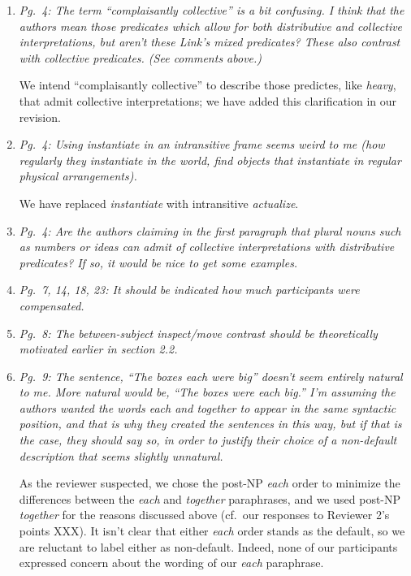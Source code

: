 \documentclass[12pt]{article}
\begin{document}
\begin{enumerate}
\item \emph{Pg.~4: The term ``complaisantly collective'' is a bit confusing. I think that the authors mean those predicates which allow for both distributive and collective interpretations, but aren't these Link's mixed predicates? These also contrast with collective predicates. (See comments above.)}

We intend ``complaisantly collective'' to describe those predictes, like \emph{heavy}, that admit collective interpretations; we have added this clarification in our revision.

\item \emph{Pg.~4: Using \emph{instantiate} in an intransitive frame seems weird to me (\emph{how regularly they instantiate in the world}, \emph{find objects that instantiate in regular physical arrangements}).}

We have replaced \emph{instantiate} with intransitive \emph{actualize}.
	
\item \emph{Pg.~4: Are the authors claiming in the first paragraph that plural nouns such as \emph{numbers} or \emph{ideas} can admit of collective interpretations with distributive predicates? If so, it would be nice to get some examples.}

\item \emph{Pg.~7, 14, 18, 23: It should be indicated how much participants were compensated.}

\item \emph{Pg.~8: The between-subject inspect/move contrast should be theoretically motivated earlier in section 2.2.}

\item \emph{Pg.~9: The sentence, ``The boxes each were big'' doesn't seem entirely natural to me. More natural would be, ``The boxes were each big.'' I'm assuming the authors wanted the words each and together to appear in the same syntactic position, and that is why they created the sentences in this way, but if that is the case, they should say so, in order to justify their choice of a non-default description that seems slightly unnatural.}

As the reviewer suspected, we chose the post-NP \emph{each} order to minimize the differences between the \emph{each} and \emph{together} paraphrases, and we used post-NP \emph{together} for the reasons discussed above (cf.~our responses to Reviewer 2's points XXX). It isn't clear that either \emph{each} order stands as the default, so we are reluctant to label either as non-default. Indeed, none of our participants expressed concern about the wording of our \emph{each} paraphrase.
	

\end{enumerate}
\end{document}
